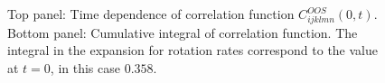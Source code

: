 \documentclass[thesis.tex]{subfiles}
\begin{document}
\begin{figure}
	\begin{center}
\end{center}
\caption{ Top panel: Time dependence of correlation function $C^{OOS}_{ijklmn}(0,t)$. Bottom panel: Cumulative integral of correlation function. The integral in the expansion for rotation rates  correspond to the value at $t=0$, in this case $0.358$.}%
\end{figure}
\end{document}
